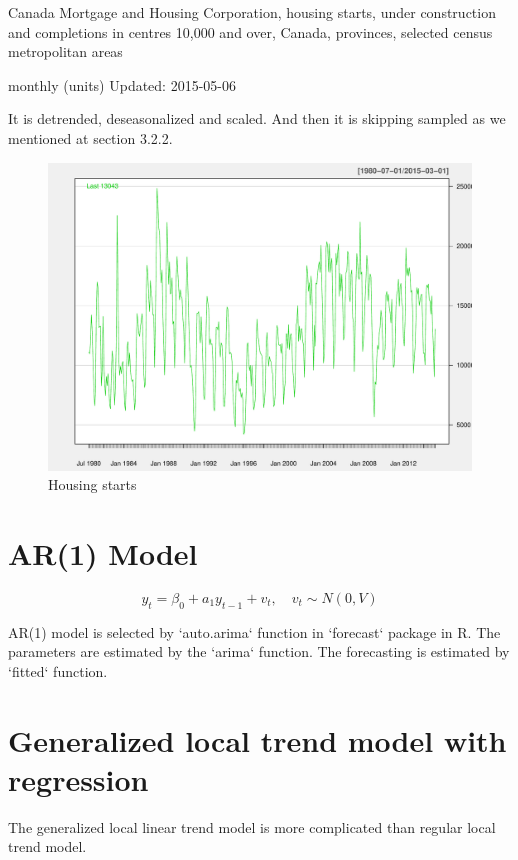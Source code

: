 Canada Mortgage and Housing Corporation, housing starts, under construction and completions in centres 10,000 and over, Canada, provinces, selected census metropolitan areas

monthly (units) Updated: 2015-05-06 

It is detrended, deseasonalized and scaled. And then it is skipping sampled as we mentioned at section 3.2.2. 

\begin{figure}
\centering
\includegraphics[width=0.7\linewidth]{Figures/house-report}
\caption{Housing starts}
\label{fig:house-report}
\end{figure}





\label{chapter:appendixC}

\section{AR(1) Model}

$$y_t = \beta_0 + a_1 y_{t-1} +v_{t}, \quad v_{t} \sim N(0, V)$$



AR(1) model is selected by `auto.arima` function in `forecast` package in R. The parameters are estimated by the `arima` function. The forecasting is estimated by `fitted` function. 



\section{Generalized local trend model with regression}


The generalized local linear trend model is more complicated than regular local trend model. 



